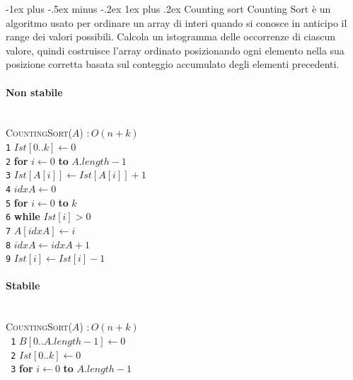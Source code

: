 \documentclass[10pt,landscape]{article}
\makeatletter
\renewcommand{\subsubsection}{\@startsection{subsubsection}{3}{0mm}%
                                {-1ex plus -.5ex minus -.2ex}%
                                {1ex plus .2ex}%
                                {\normalfont\normalsize\bfseries}}
\newcommand{\myparagraph}[1]{\paragraph{#1}\mbox{}\\ [5pt]}
\makeatother
\begin{document}
\begin{multicols*}{4}
                \subsubsection{Counting sort}
                Counting Sort è un algoritmo usato per ordinare un array di interi quando si conosce in anticipo il range dei valori possibili. Calcola un istogramma delle occorrenze di ciascun valore, quindi costruisce l'array ordinato posizionando ogni elemento nella sua posizione corretta basata sul conteggio accumulato degli elementi precedenti.
                \myparagraph{Non stabile}
                \textsc{CountingSort($A$)} $: O(n+k)$\\ [3pt]
                \verb|1|\hspace*{0.5em} $Ist[0..k] \leftarrow 0$\\
                \verb|2|\hspace*{0.5em} \textbf{for} $i \leftarrow 0$ \textbf{to} $A.length - 1$\\
                \verb|3|\hspace*{1.5em} $Ist[A[i]] \leftarrow Ist[A[i]] + 1$\\
                \verb|4|\hspace*{0.5em} $idxA \leftarrow 0$\\
                \verb|5|\hspace*{0.5em} \textbf{for} $i \leftarrow 0$ \textbf{to} $k$\\
                \verb|6|\hspace*{1.5em} \textbf{while} $Ist[i] > 0$\\
                \verb|7|\hspace*{2.5em} $A[idxA] \leftarrow i$\\
                \verb|8|\hspace*{2.5em} $idxA \leftarrow idxA + 1$\\
                \verb|9|\hspace*{2.5em} $Ist[i] \leftarrow Ist[i] - 1$
                \myparagraph{Stabile}
                \textsc{CountingSort($A$)} $: O(n+k)$\\ [3pt]
                \verb| 1|\hspace*{0.5em} $B[0..A.length - 1] \leftarrow 0$\\
                \verb| 2|\hspace*{0.5em} $Ist[0..k] \leftarrow 0$\\
                \verb| 3|\hspace*{0.5em} \textbf{for} $i \leftarrow 0$ \textbf{to} $A.length - 1$\\

\end{multicols*}
\end{document}
